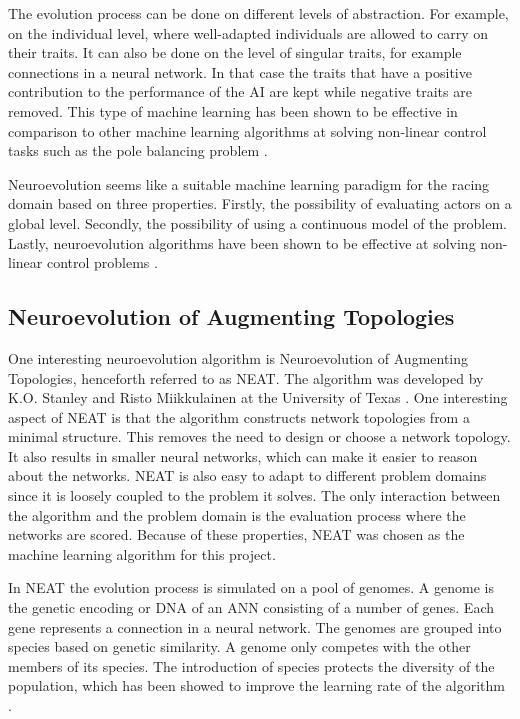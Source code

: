 The evolution process can be done on different levels of abstraction. For example, on the individual level, where well-adapted individuals are allowed to carry on their traits. It can also be done on the level of singular traits, for example connections in a neural network. In that case the traits that have a positive contribution to the performance of the AI are kept while negative traits are removed. This type of machine learning has been shown to be effective in comparison to other machine learning algorithms at solving non-linear control tasks such as the pole balancing problem \cite{gomez:efficient_nonlinear_control}.

Neuroevolution seems like a suitable machine learning paradigm for the racing domain based on three properties. Firstly, the possibility of evaluating actors on a global level. Secondly, the possibility of using a continuous model of the problem. Lastly, neuroevolution algorithms have been shown to be effective at solving non-linear control problems \cite{gomez:efficient_nonlinear_control}. 


\subsection{Neuroevolution of Augmenting Topologies} 
\label{theory:neat}

One interesting neuroevolution algorithm is Neuroevolution of Augmenting Topologies, henceforth referred to as NEAT. The algorithm was developed by K.O. Stanley and Risto Miikkulainen at the University of Texas \cite{stanley:neat}. One interesting aspect of NEAT is that the algorithm constructs network topologies from a minimal structure. This removes the need to design or choose a network topology. It also results in smaller neural networks, which can make it easier to reason about the networks. NEAT is also easy to adapt to different problem domains since it is loosely coupled to the problem it solves. The only interaction between the algorithm and the problem domain is the evaluation process where the networks are scored. Because of these properties, NEAT was chosen as the machine learning algorithm for this project. 

In NEAT the evolution process is simulated on a pool of genomes. A genome is the genetic encoding or DNA of an ANN consisting of a number of genes. Each gene represents a connection in a neural network. The genomes are grouped into species based on genetic similarity. A genome only competes with the other members of its species. The introduction of species protects the diversity of the population, which has been showed to improve the learning rate of the algorithm \cite{stanley:neat}.  

